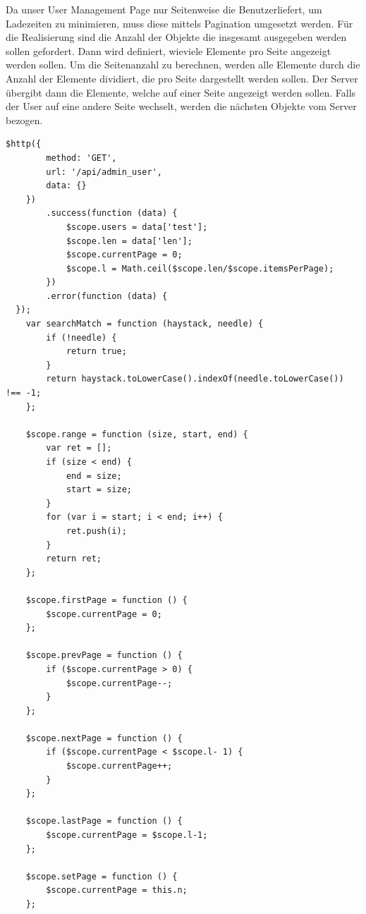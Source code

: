 Da unser User Management Page nur Seitenweise die Benutzerliefert, um Ladezeiten zu minimieren, muss diese mittels Pagination umgesetzt werden. Für die Realisierung sind die Anzahl der Objekte die insgesamt ausgegeben werden sollen gefordert. Dann wird definiert, wieviele Elemente pro Seite angezeigt werden sollen. Um die Seitenanzahl zu berechnen,  werden alle Elemente durch die Anzahl der Elemente dividiert, die pro Seite dargestellt werden sollen. Der Server übergibt dann die Elemente, welche auf einer Seite angezeigt werden sollen. Falls der User auf eine andere Seite wechselt, werden die nächsten Objekte vom Server bezogen.
\begin{lstlisting}
$http({
        method: 'GET',
        url: '/api/admin_user',
        data: {}
    })
        .success(function (data) {
            $scope.users = data['test'];
            $scope.len = data['len'];
            $scope.currentPage = 0;
            $scope.l = Math.ceil($scope.len/$scope.itemsPerPage);
        })
        .error(function (data) {
  });
    var searchMatch = function (haystack, needle) {
        if (!needle) {
            return true;
        }
        return haystack.toLowerCase().indexOf(needle.toLowerCase()) !== -1;
    };

    $scope.range = function (size, start, end) {
        var ret = [];
        if (size < end) {
            end = size;
            start = size;
        }
        for (var i = start; i < end; i++) {
            ret.push(i);
        }
        return ret;
    };

    $scope.firstPage = function () {
        $scope.currentPage = 0;
    };

    $scope.prevPage = function () {
        if ($scope.currentPage > 0) {
            $scope.currentPage--;
        }
    };

    $scope.nextPage = function () {
        if ($scope.currentPage < $scope.l- 1) {
            $scope.currentPage++;
        }
    };

    $scope.lastPage = function () {
        $scope.currentPage = $scope.l-1;
    };

    $scope.setPage = function () {
        $scope.currentPage = this.n;
    };

\end{lstlisting}

